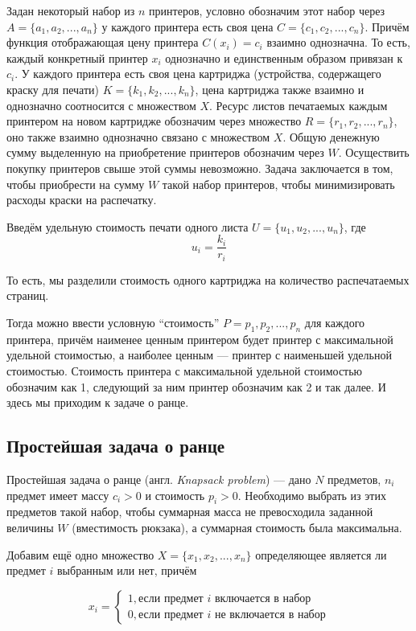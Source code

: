 
Задан некоторый набор из $n$ принтеров, условно обозначим этот набор через $A = \{a_1, a_2, ..., a_n\}$ у каждого принтера есть своя цена $C=\{c_1, c_2, ..., c_n\}$. Причём функция отображающая цену принтера $C(x_i)= c_i$ взаимно однозначна. То есть, каждый конкретный принтер $x_i$ однозначно и единственным образом привязан к $c_i$. У каждого принтера есть своя цена картриджа (устройства, содержащего краску для печати) $K=\{k_1, k_2, ...,k_n\}$, цена картриджа также взаимно и однозначно соотносится с множеством $X$. Ресурс листов печатаемых каждым принтером на новом картридже обозначим через множество $R=\{r_1, r_2, ..., r_n\}$, оно также взаимно однозначно связано с множеством $X$. Общую денежную сумму выделенную на приобретение принтеров обозначим через $W$. Осуществить покупку принтеров свыше этой суммы невозможно. Задача заключается в том, чтобы приобрести на сумму $W$ такой набор принтеров, чтобы минимизировать расходы краски на распечатку.

Введём удельную стоимость печати одного листа $U=\{u_1, u_2, ..., u_n\}$, где $$u_i = \frac {k_i} {r_i}$$

То есть, мы разделили стоимость одного картриджа на количество распечатаемых страниц.

Тогда можно ввести условную ``стоимость'' $P={p_1, p_2, ..., p_n}$ для каждого принтера, причём наименее ценным принтером будет принтер с максимальной удельной стоимостью, а наиболее ценным --- принтер с наименьшей удельной стоимостью. Стоимость принтера с максимальной удельной стоимостью обозначим как 1, следующий за ним принтер обозначим как 2 и так далее. И здесь мы приходим к задаче о ранце.

\subsection*{Простейшая задача о ранце}

Простейшая задача о ранце (англ. \emph{Knapsack problem}) --- дано $N$ предметов, $n_i$ предмет имеет массу $c_i>0$ и стоимость $p_i>0$. Необходимо выбрать из этих предметов такой набор, чтобы суммарная масса не превосходила заданной величины $W$ (вместимость рюкзака), а суммарная стоимость была максимальна.

Добавим ещё одно множество $X=\{x_1, x_2, ..., x_n\}$ определяющее является ли предмет $i$ выбранным или нет, причём

$$x_i = \left\{
\begin{aligned}
1, \text{если предмет $i$ включается в набор} \\
0, \text{если предмет $i$ не включается в набор}
\end{aligned}
\right.
$$

